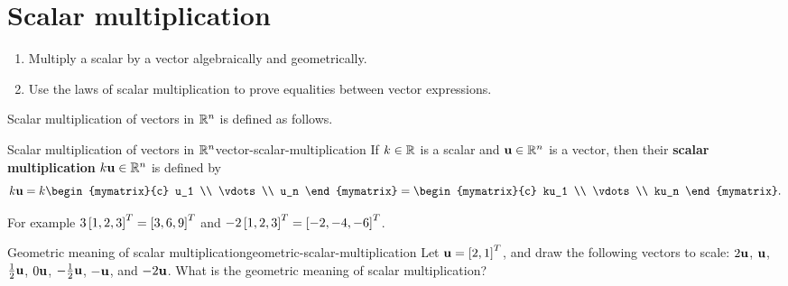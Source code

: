 \section{Scalar multiplication}

\begin{outcome}
  \begin{enumerate}
  \item Multiply a scalar by a vector algebraically and geometrically.
  \item Use the laws of scalar multiplication to prove equalities
    between vector expressions.
  \end{enumerate}
\end{outcome}

Scalar multiplication of vectors in $\mathbb{R}^n$ is defined as
follows.

\begin{definition}{Scalar multiplication of vectors in $\mathbb{R}^n$}{vector-scalar-multiplication}
  If $k\in\mathbb{R}$ is a scalar and $\vect{u}\in \R^n$ is a vector, then
  their \textbf{scalar multiplication}%
   $k\vect{u}\in \R^n$ is
  defined by
  \begin{equation*}
    k\vect{u}=k\begin{mymatrix}{c}
      u_1 \\
      \vdots \\
      u_n
    \end{mymatrix} = \begin{mymatrix}{c}
      ku_1 \\
      \vdots \\
      ku_n
    \end{mymatrix}.
  \end{equation*}
\end{definition}

For example $3 \left[ 1, 2, 3 \right]^T = \left[ 3, 6, 9 \right]^T$ and
$-2\left[ 1, 2, 3 \right]^T = \left[ -2, -4, -6 \right]^T$.

\begin{example}{Geometric meaning of scalar multiplication}{geometric-scalar-multiplication}
  Let $\vect{u}=\mat{2,1}^T$, and draw the following vectors to scale:
  $2\vect{u}$, $\vect{u}$, $\frac{1}{2}\vect{u}$, $0\vect{u}$,
  $-\frac{1}{2}\vect{u}$, $-\vect{u}$, and $-2\vect{u}$.  What is the
  geometric meaning of scalar multiplication?
\end{example}

